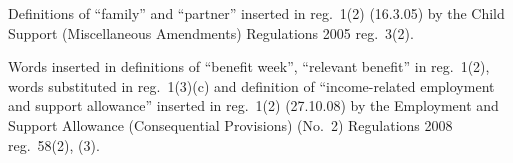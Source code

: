 \documentclass[a4paper,12pt]{article}
\begin{document}
{%
%
%
%
%

Definitions of ``family'' and ``partner'' inserted in reg.~1(2) (16.3.05) by the Child Support (Miscellaneous Amendments) Regulations 2005 reg.~3(2).

Words inserted in definitions of ``benefit week'', ``relevant benefit'' in reg.~1(2), words substituted in reg.~1(3)(c) and definition of ``income-related employment and support allowance'' inserted in reg.~1(2)
(27.10.08) by the Employment and Support Allowance (Consequential Provisions) (No.~2) Regulations 2008 reg.~58(2), (3).

}
\end{document}
